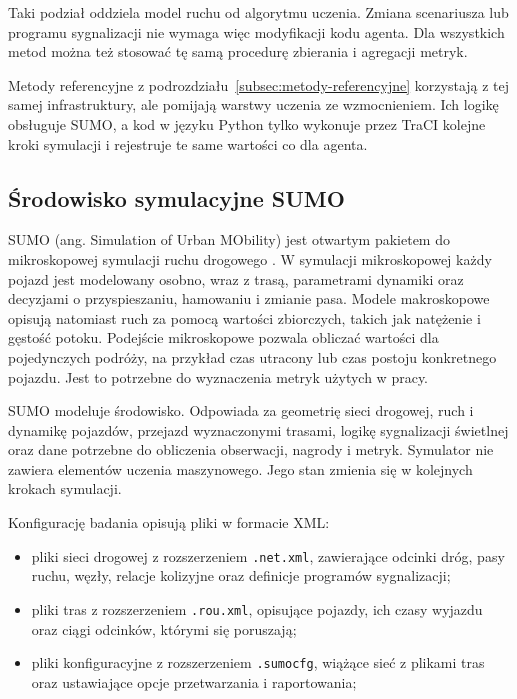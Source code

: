 Taki podział oddziela model ruchu od algorytmu uczenia. Zmiana scenariusza lub programu sygnalizacji nie wymaga więc modyfikacji kodu agenta. Dla wszystkich metod można też stosować tę samą procedurę zbierania i agregacji metryk.

Metody referencyjne z podrozdziału~\ref{subsec:metody-referencyjne} korzystają z tej samej infrastruktury, ale pomijają warstwy uczenia ze wzmocnieniem. Ich logikę obsługuje SUMO, a kod w języku Python tylko wykonuje przez TraCI kolejne kroki symulacji i rejestruje te same wartości co dla agenta.

\subsection{Środowisko symulacyjne SUMO}
\label{subsec:sumo}

SUMO (ang. Simulation of Urban MObility) jest otwartym pakietem do mikroskopowej symulacji ruchu drogowego \cite{lopez2018sumo}. W symulacji mikroskopowej każdy pojazd jest modelowany osobno, wraz z trasą, parametrami dynamiki oraz decyzjami o przyspieszaniu, hamowaniu i zmianie pasa. Modele makroskopowe opisują natomiast ruch za pomocą wartości zbiorczych, takich jak natężenie i gęstość potoku. Podejście mikroskopowe pozwala obliczać wartości dla pojedynczych podróży, na przykład czas utracony lub czas postoju konkretnego pojazdu. Jest to potrzebne do wyznaczenia metryk użytych w pracy.

SUMO modeluje środowisko. Odpowiada za geometrię sieci drogowej, ruch i dynamikę pojazdów, przejazd wyznaczonymi trasami, logikę sygnalizacji świetlnej oraz dane potrzebne do obliczenia obserwacji, nagrody i metryk. Symulator nie zawiera elementów uczenia maszynowego. Jego stan zmienia się w kolejnych krokach symulacji.

Konfigurację badania opisują pliki w formacie XML:
\begin{itemize}
    \item pliki sieci drogowej z rozszerzeniem \texttt{.net.xml}, zawierające odcinki dróg, pasy ruchu, węzły, relacje kolizyjne oraz definicje programów sygnalizacji;
    \item pliki tras z rozszerzeniem \texttt{.rou.xml}, opisujące pojazdy, ich czasy wyjazdu oraz ciągi odcinków, którymi się poruszają;
    \item pliki konfiguracyjne z rozszerzeniem \texttt{.sumocfg}, wiążące sieć z plikami tras oraz ustawiające opcje przetwarzania i raportowania;
\end{itemize}

